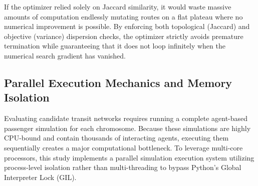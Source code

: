 {{If the optimizer relied solely on Jaccard similarity, it would waste massive amounts of computation endlessly mutating routes on a flat plateau where no numerical improvement is possible. By enforcing both topological (Jaccard) and objective (variance) dispersion checks, the optimizer strictly avoids premature termination while guaranteeing that it does not loop infinitely when the numerical search gradient has vanished.

\subsection{Parallel Execution Mechanics and Memory Isolation}
\label{sec:parallelization}
\noindent
Evaluating candidate transit networks requires running a complete agent-based passenger simulation for each chromosome. Because these simulations are highly CPU-bound and contain thousands of interacting agents, executing them sequentially creates a major computational bottleneck. To leverage multi-core processors, this study implements a parallel simulation execution system utilizing process-level isolation rather than multi-threading to bypass Python's Global Interpreter Lock (GIL).

}}
